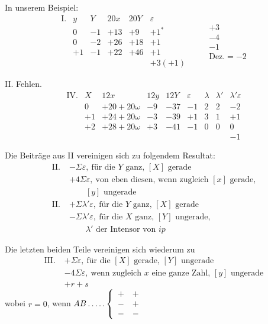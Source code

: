 In unserem Beispiel:
\[
\begin{array}{rc|r|r|r|r}
\mathrm{I.}&y&Y&20x&20Y&\varepsilon\\
&0&-1&+13&+9&+1^{*}\\
&0&-2&+26&+18&+1\\
&+1&-1&+22&+46&+1\\
&&&&&+3(+1)
\end{array}
\qquad
\begin{array}{r}
+3\\-4\\-1\\\hline
\text{Dez.}=-2
\end{array}
\]

II. Fehlen.
\begingroup\small\setlength{\arraycolsep}{2pt}
\[
\begin{array}{rc|r|r|r|r|r|r|r}
\mathrm{IV.}&X&12x&12y&12Y&\varepsilon&\lambda&\lambda'&\lambda'\varepsilon\\
&0&+20+20\omega&-9&-37&-1&2&2&-2\\
&+1&+24+20\omega&-3&-39&+1&3&1&+1\\
&+2&+28+20\omega&+3&-41&-1&0&0&0\\
&&&&&&&&-1
\end{array}
\]
\endgroup

Die Beiträge aus II vereinigen sich zu folgendem Resultat:
\[
\begin{aligned}
\mathrm{II.}\;&-\Sigma\varepsilon,\ \text{für die }Y\text{ ganz, }[X]\text{ gerade}\\
&+4\Sigma\varepsilon,\ \text{von eben diesen, wenn zugleich }[x]\text{ gerade,}\\
&\qquad[y]\text{ ungerade}\\
\mathrm{II.}\;&+\Sigma\lambda'\varepsilon,\ \text{für die }Y\text{ ganz, }[X]\text{ gerade}\\
&-\Sigma\lambda'\varepsilon,\ \text{für die }X\text{ ganz, }[Y]\text{ ungerade,}\\
&\qquad\lambda'\text{ der Intensor von }ip
\end{aligned}
\]

Die letzten beiden Teile vereinigen sich wiederum zu
\[
\begin{aligned}
\mathrm{III.}\;&+\Sigma\varepsilon,\ \text{für die }[X]\text{ gerade, }[Y]\text{ ungerade}\\
&-4\Sigma\varepsilon,\ \text{wenn zugleich }x\text{ eine ganze Zahl, }[y]\text{ ungerade}\\
&+r+s
\end{aligned}
\]
wobei $r=0$, wenn $AB\mathinner{.\,.\,.\,.\,.}\left\{\begin{array}{cc}+&+\\-&+\\-&-\end{array}\right.$

